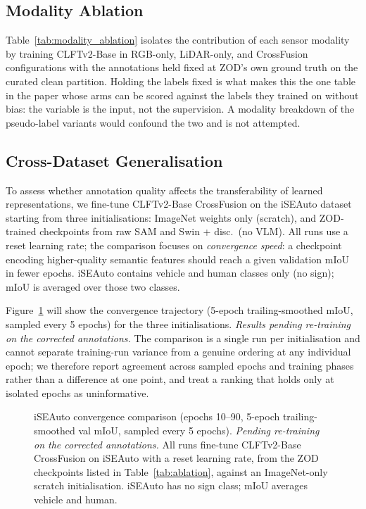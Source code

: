 \documentclass[conference]{IEEEtran}
\begin{document}


\subsection{Modality Ablation}

Table~\ref{tab:modality_ablation} isolates the contribution of each sensor modality by training
CLFTv2-Base in RGB-only, LiDAR-only, and CrossFusion configurations with the annotations held fixed at
ZOD's own ground truth on the curated clean partition.
Holding the labels fixed is what makes this the one table in the paper whose arms can be scored against
the labels they trained on without bias: the variable is the input, not the supervision.
A modality breakdown of the pseudo-label variants would confound the two and is not attempted.



\subsection{Cross-Dataset Generalisation}

To assess whether annotation quality affects the transferability of learned representations, we fine-tune CLFTv2-Base CrossFusion on the iSEAuto dataset starting from three initialisations: ImageNet weights only (scratch), and ZOD-trained checkpoints from raw SAM and Swin + disc.\ (no VLM).
All runs use a reset learning rate; the comparison focuses on \emph{convergence speed}: a checkpoint encoding higher-quality semantic features should reach a given validation mIoU in fewer epochs.
iSEAuto contains vehicle and human classes only (no sign); mIoU is averaged over those two classes.

Figure~\ref{fig:iseauto_convergence} will show the convergence trajectory (5-epoch trailing-smoothed mIoU, sampled every 5 epochs) for the three initialisations. \textit{Results pending re-training on the corrected annotations.}
The comparison is a single run per initialisation and cannot separate training-run variance from a genuine ordering at any individual epoch; we therefore report agreement across sampled epochs and training phases rather than a difference at one point, and treat a ranking that holds only at isolated epochs as uninformative.

\begin{figure}[t]
  \centering
  
  \caption{iSEAuto convergence comparison (epochs 10--90, 5-epoch trailing-smoothed val mIoU, sampled every 5 epochs). \textit{Pending re-training on the corrected annotations.}
           All runs fine-tune CLFTv2-Base CrossFusion on iSEAuto with a reset learning rate, from the ZOD checkpoints listed in Table~\ref{tab:ablation}, against an ImageNet-only scratch initialisation.
           iSEAuto has no sign class; mIoU averages vehicle and human.}
  \label{fig:iseauto_convergence}
\end{figure}
\end{document}

